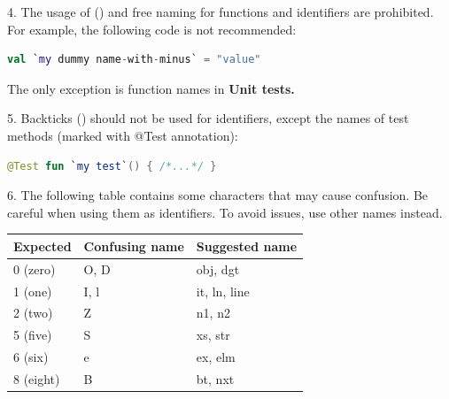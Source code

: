 {{{{{{{{{{{{{{{{\begin{center}
\begin{tabular}{ |p{5.0cm}|p{5.0cm}|p{5.0cm}| }
\hline

\end{tabular}

\end{center}

4.	The usage of (\textbf{}) and free naming for functions and identifiers are prohibited. For example, the following code is not recommended:



\begin{lstlisting}[language=Kotlin]
val `my dummy name-with-minus` = "value" 
\end{lstlisting}


The only exception is function names in \textbf{Unit tests.}



5.	Backticks (\textbf{}) should not be used for identifiers, except the names of test methods (marked with @Test annotation):

\begin{lstlisting}[language=Kotlin]
 @Test fun `my test`() { /*...*/ }
\end{lstlisting}
6.  The following table contains some characters that may cause confusion. Be careful when using them as identifiers. To avoid issues, use other names instead.

\begin{center}

\begin{tabular}{ |p{5.0cm}|p{5.0cm}|p{5.0cm}| }

\hline

Expected&Confusing name&Suggested name\\

\hline

 0 (zero)      & O, D                     & obj, dgt         \\

 1 (one)       & I, l                     & it, ln, line     \\

 2 (two)       & Z                        & n1, n2           \\

 5 (five)      & S                        & xs, str          \\

 6 (six)       & e                        & ex, elm          \\

 8 (eight)     & B                        & bt, nxt          \\


\end{tabular}
\end{center}}}}}}}}}}}}}}}}}
